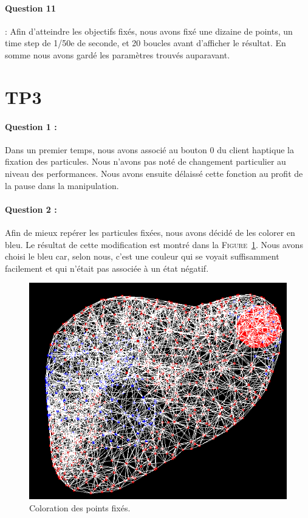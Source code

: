 \documentclass[a4paper,12pt]{article}
\begin{document}
\paragraph{Question 11} : Afin d'atteindre les objectifs fixés, nous avons fixé une dizaine de points, un time step de 1/50e de seconde, et 20 boucles avant d'afficher le résultat. En somme nous avons gardé les paramètres trouvés auparavant.

\section{TP3}

\paragraph{Question 1 :} Dans un premier temps, nous avons associé au bouton 0 du client haptique la fixation des particules. Nous n'avons pas noté de changement particulier au niveau des performances. Nous avons ensuite délaissé cette fonction au profit de la pause dans la manipulation.

\paragraph{Question 2 :} Afin de mieux repérer les particules fixées, nous avons décidé de les colorer en bleu. Le résultat de cette modification est montré dans la \textsc{Figure}~\ref{fig:fixed}. Nous avons choisi le bleu car, selon nous, c'est une couleur qui se voyait suffisamment facilement et qui n'était pas associée à un état négatif.
\begin{figure}
  \centering
  \includegraphics{images/couleur_points_fixes.png}
  \caption{Coloration des points fixés.}
  \label{fig:fixed}
\end{figure}
\end{document}

